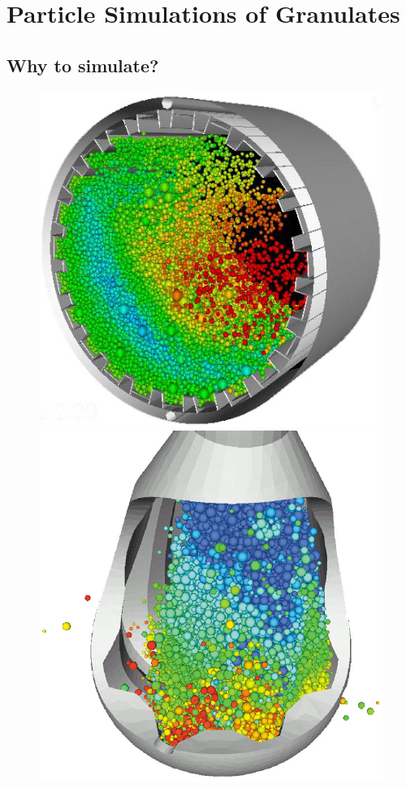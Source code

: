 \section{Particle Simulations of Granulates}

\subsection{Why to simulate? \citep{por}}

\begin{figure}[H]
\includegraphics[scale=0.25]{../images/Intro/simulation.jpg}
\includegraphics[scale=0.25]{../images/Intro/simulation1.jpg}
\end{figure}

